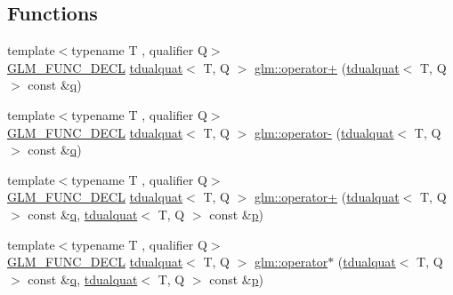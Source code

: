 \subsection*{Functions}
\begin{DoxyCompactItemize}
\item 
{\footnotesize template$<$typename T , qualifier Q$>$ }\\\hyperlink{setup_8hpp_ab2d052de21a70539923e9bcbf6e83a51}{G\+L\+M\+\_\+\+F\+U\+N\+C\+\_\+\+D\+E\+CL} \hyperlink{structglm_1_1tdualquat}{tdualquat}$<$ T, Q $>$ \hyperlink{group__gtx__dual__quaternion_ga11a89ba9d2bc5ef4ab9bd77ac231fe63}{glm\+::operator+} (\hyperlink{structglm_1_1tdualquat}{tdualquat}$<$ T, Q $>$ const \&\hyperlink{_s_d_l__opengl_8h_a8fc1e7b9baaae687804c7eed46ca09c6}{q})
\item 
{\footnotesize template$<$typename T , qualifier Q$>$ }\\\hyperlink{setup_8hpp_ab2d052de21a70539923e9bcbf6e83a51}{G\+L\+M\+\_\+\+F\+U\+N\+C\+\_\+\+D\+E\+CL} \hyperlink{structglm_1_1tdualquat}{tdualquat}$<$ T, Q $>$ \hyperlink{group__gtx__dual__quaternion_ga2245f8ea1b7c8a3fccfc92ca97ef03de}{glm\+::operator-\/} (\hyperlink{structglm_1_1tdualquat}{tdualquat}$<$ T, Q $>$ const \&\hyperlink{_s_d_l__opengl_8h_a8fc1e7b9baaae687804c7eed46ca09c6}{q})
\item 
{\footnotesize template$<$typename T , qualifier Q$>$ }\\\hyperlink{setup_8hpp_ab2d052de21a70539923e9bcbf6e83a51}{G\+L\+M\+\_\+\+F\+U\+N\+C\+\_\+\+D\+E\+CL} \hyperlink{structglm_1_1tdualquat}{tdualquat}$<$ T, Q $>$ \hyperlink{group__gtx__dual__quaternion_ga55e10eaaabe1166be6314df62591c134}{glm\+::operator+} (\hyperlink{structglm_1_1tdualquat}{tdualquat}$<$ T, Q $>$ const \&\hyperlink{_s_d_l__opengl_8h_a8fc1e7b9baaae687804c7eed46ca09c6}{q}, \hyperlink{structglm_1_1tdualquat}{tdualquat}$<$ T, Q $>$ const \&\hyperlink{_s_d_l__opengl__glext_8h_aa5367c14d90f462230c2611b81b41d23}{p})
\item 
{\footnotesize template$<$typename T , qualifier Q$>$ }\\\hyperlink{setup_8hpp_ab2d052de21a70539923e9bcbf6e83a51}{G\+L\+M\+\_\+\+F\+U\+N\+C\+\_\+\+D\+E\+CL} \hyperlink{structglm_1_1tdualquat}{tdualquat}$<$ T, Q $>$ \hyperlink{group__gtx__dual__quaternion_ga01828eee9e1cf1f56e4018fcdc910aa0}{glm\+::operator$\ast$} (\hyperlink{structglm_1_1tdualquat}{tdualquat}$<$ T, Q $>$ const \&\hyperlink{_s_d_l__opengl_8h_a8fc1e7b9baaae687804c7eed46ca09c6}{q}, \hyperlink{structglm_1_1tdualquat}{tdualquat}$<$ T, Q $>$ const \&\hyperlink{_s_d_l__opengl__glext_8h_aa5367c14d90f462230c2611b81b41d23}{p})

\end{DoxyCompactItemize}
